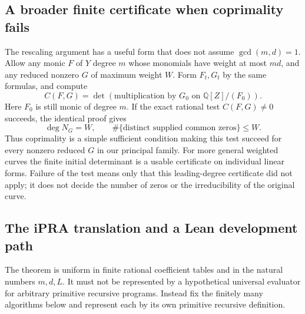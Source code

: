 \subsection{A broader finite certificate when coprimality fails}

The rescaling argument has a useful form that does not assume
$\gcd(m,d)=1$.  Allow any monic $F$ of $Y$ degree $m$ whose monomials
have weight at most $md$, and any reduced nonzero $G$ of maximum
weight $W$.  Form $F_t,G_t$ by the same formulas, and compute
\[
 C(F,G)=\det\left(\text{multiplication by }G_0
                 \text{ on }\mathbb Q[Z]/(F_0)\right).
\]
Here $F_0$ is still monic of degree $m$.  If the exact rational test
$C(F,G)\ne0$ succeeds, the identical proof gives
\[
 \deg N_G=W,\qquad
 \#\{\text{distinct supplied common zeros}\}\le W.
\]
Thus coprimality is a simple sufficient condition making this test
succeed for every nonzero reduced $G$ in our principal family.  For
more general weighted curves the finite initial determinant is a usable
certificate on individual linear forms.  Failure of the test means only
that this leading-degree certificate did not apply; it does not decide
the number of zeros or the irreducibility of the original curve.

\subsection{The iPRA translation and a Lean development path}

The theorem is uniform in finite rational coefficient tables and in the
natural numbers $m,d,L$.  It must not be represented by a hypothetical
universal evaluator for arbitrary primitive recursive programs.  Instead
fix the finitely many algorithms below and represent each by its own
primitive recursive definition.

